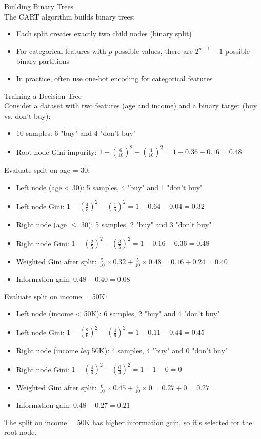 \begin{concept}{Building Binary Trees}\\
The CART algorithm builds binary trees:
\begin{itemize}
    \item Each split creates exactly two child nodes (binary split)
    \item For categorical features with $p$ possible values, there are $2^{p-1} - 1$ possible binary partitions
    \item In practice, often use one-hot encoding for categorical features
\end{itemize}
\end{concept}

\begin{example2}{Training a Decision Tree}\\
Consider a dataset with two features (age and income) and a binary target (buy vs. don't buy):
\begin{itemize}
    \item 10 samples: 6 "buy" and 4 "don't buy"
    \item Root node Gini impurity: $1 - (\frac{6}{10})^2 - (\frac{4}{10})^2 = 1 - 0.36 - 0.16 = 0.48$
\end{itemize}
\tcblower
Evaluate split on age = 30:
\begin{itemize}
    \item Left node (age < 30): 5 samples, 4 "buy" and 1 "don't buy"
    \item Left node Gini: $1 - (\frac{4}{5})^2 - (\frac{1}{5})^2 = 1 - 0.64 - 0.04 = 0.32$
    \item Right node (age $\leq$ 30): 5 samples, 2 "buy" and 3 "don't buy"
    \item Right node Gini: $1 - (\frac{2}{5})^2 - (\frac{3}{5})^2 = 1 - 0.16 - 0.36 = 0.48$
    \item Weighted Gini after split: $\frac{5}{10} \times 0.32 + \frac{5}{10} \times 0.48 = 0.16 + 0.24 = 0.40$
    \item Information gain: $0.48 - 0.40 = 0.08$
\end{itemize}

Evaluate split on income = 50K:
\begin{itemize}
    \item Left node (income < 50K): 6 samples, 2 "buy" and 4 "don't buy"
    \item Left node Gini: $1 - (\frac{2}{6})^2 - (\frac{4}{6})^2 = 1 - 0.11 - 0.44 = 0.45$
    \item Right node (income $leq$ 50K): 4 samples, 4 "buy" and 0 "don't buy"
    \item Right node Gini: $1 - (\frac{4}{4})^2 - (\frac{0}{4})^2 = 1 - 1 - 0 = 0$
    \item Weighted Gini after split: $\frac{6}{10} \times 0.45 + \frac{4}{10} \times 0 = 0.27 + 0 = 0.27$
    \item Information gain: $0.48 - 0.27 = 0.21$
\end{itemize}

The split on income = 50K has higher information gain, so it's selected for the root node.
\end{example2}

